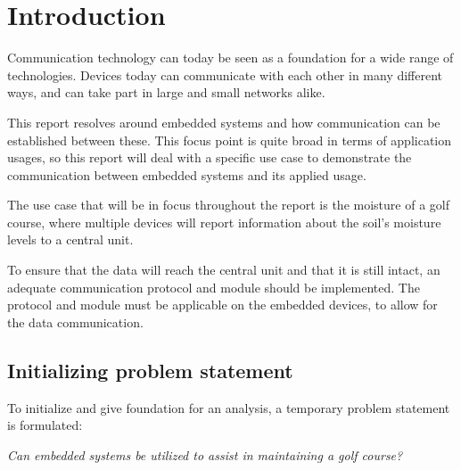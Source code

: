 \chapter{Introduction}
Communication technology can today be seen as a foundation for a wide range of technologies. Devices today can communicate with each other in many different ways, and can take part in large and small networks alike.

This report resolves around embedded systems and how communication can be established between these. This focus point is quite broad in terms of application usages, so this report will deal with a specific use case to demonstrate the communication between embedded systems and its applied usage.

The use case that will be in focus throughout the report is the moisture of a golf course, where multiple devices will report information about the soil's moisture levels to a central unit. 


To ensure that the data will reach the central unit and that it is still intact, an adequate communication protocol and module should be implemented. The protocol and module must be applicable on the embedded devices, to allow for the data communication. 

\section{Initializing problem statement}
To initialize and give foundation for an analysis, a temporary problem statement is formulated:

\textit{Can embedded systems be utilized to assist in maintaining a golf course?}


